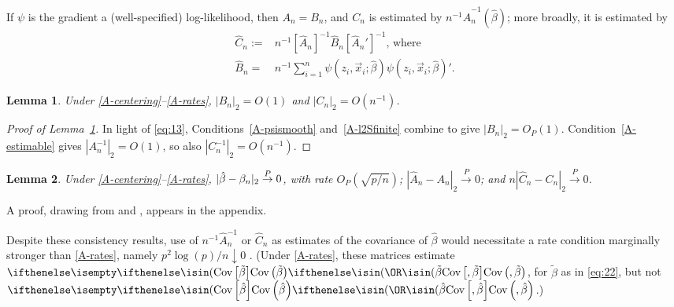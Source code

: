 \documentclass{article}
\newtheorem{lemma}{Lemma}
\theoremstyle{remark}
\begin{document}
If $\psi$ is the gradient a (well-specified) log-likelihood, then $A_{n}=B_{n}$, and $C_{n}$ is estimated by $n^{-1}\hat{A}_{n}^{-1}(\hat\beta)$; more broadly, it is estimated by 
\begin{align*}
\hat{C}_{n} :=& n^{-1} [\hat{A}_{n}]^{-1} \hat{B}_{n} [\hat{A}_{n}']^{-1},\, \text{where}\\
\hat{B}_{n}  =&  n^{-1} \sum_{i=1}^{n} \psi(z_{i}, \vec{x}_{i};  \hat{\beta} ) \psi(z_{i}, \vec{x}_{i};  \hat{\beta} )'.  
\end{align*}

\begin{lemma} \label{lem:C-rate}
  Under \ref{A-centering}--\ref{A-rates}, $|B_{n}|_{2} = O(1)$ and $|C_{n}|_{2} = O(n^{-1})$.
\end{lemma}

\begin{proof}[Proof of Lemma~\ref{lem:C-rate}]
  In light of \eqref{eq:13}, Conditions~\ref{A-psismooth} and~\ref{A-l2Sfinite} combine to give $|B_{n}|_{2} = O_{P}(1)$.  Condition~\ref{A-estimable} gives $|{A}_{n}^{-1}|_{2}=O(1)$, so also $|{C}_{n}^{-1}|_{2}=O(n^{-1})$.
\end{proof}


\begin{lemma} \label{lem:ChatC}
  Under \ref{A-centering}--\ref{A-rates}, $|\hat\beta - \beta_{n }|_{2} \stackrel{P}{\rightarrow} 0$, with rate $O_{P}\left( \sqrt{p/n} \right)$;   $|\hat{A}_{n} - A_{n}|_{2} \stackrel{P}{\rightarrow} 0$; and $n|\hat{C}_{n} - C_{n}|_{2} \stackrel{P}{\rightarrow} 0$. 
\end{lemma}

A proof, drawing from \citet{he2000parameters} and \citet{wang2011gee}, appears in the appendix.

Despite these consistency results, use of $n^{-1}\hat{A}_{n}^{-1}$ or
$\hat{C}_{n}$ as estimates of the covariance of $\hat\beta$ would
necessitate a rate condition marginally stronger than \ref{A-rates}, namely $p^{2}\log(p)/n \downarrow 0$ \citep[Theorem~2.2]{he2000parameters}. (Under \ref{A-rates}, these matrices estimate $\Cov{\tilde{\beta}}$, for $\tilde\beta$ as in \eqref{eq:22}, but not $\Cov{\hat\beta}$.)
\end{document}
